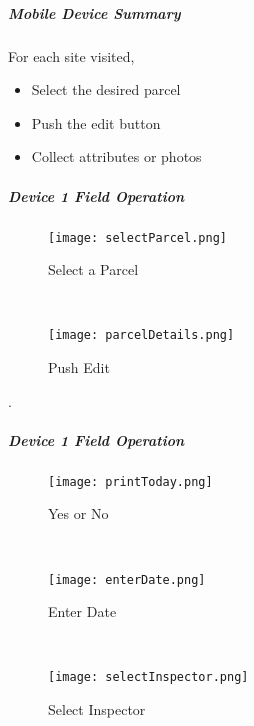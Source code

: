  \subparagraph{Mobile Device Summary}

 For each site visited,

 \begin{itemize}
 \item Select the desired parcel
 \item Push the edit button
 \item Collect attributes or photos
 \end{itemize}

 \clearpage
  
  
\subparagraph{Device 1 Field Operation}

\begin{wrapfigure}{r}{0.5\textwidth}
\centering
    \texttt{[image: selectParcel.png]}
\caption {Select a Parcel}
\vspace{.25in}

\HRule \\[.4cm] %
\vspace{.25in}

\centering
    \texttt{[image: parcelDetails.png]}
\caption{Push Edit}
\end{wrapfigure}
.
\vspace{2.5in}

\vspace{4.5in}

\clearpage
\subparagraph*{Device 1 Field Operation}
\begin{wrapfigure}{r}{0.4\textwidth}
\centering
    \texttt{[image: printToday.png]}
\caption {Yes or No}
\vspace{.05in}

\HRule \\[.4cm] %
\vspace{.05in}

    \texttt{[image: enterDate.png]}
\caption{Enter Date}
\vspace{.05in}

\HRule \\[.4cm] %
\vspace{.05in}

    \texttt{[image: selectInspector.png]}
\caption{Select Inspector}
\end{wrapfigure}


